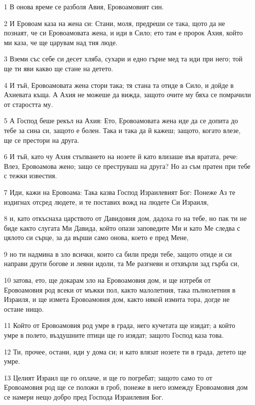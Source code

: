 \par 1 В онова време се разболя Авия, Еровоамовият син.
\par 2 И Еровоам каза на жена си: Стани, моля, предреши се така, щото да не познаят, че си Еровоамовата жена, и иди в Сило; ето там е пророк Ахия, който ми каза, че ще царувам над тия люде.
\par 3 Вземи със себе си десет хляба, сухари и едно гърне мед та иди при него; той ще ти яви какво ще стане на детето.
\par 4 И тъй, Еровоамовата жена стори така; тя стана та отиде в Сило, и дойде в Ахиевата къща. А Ахия не можеше да вижда, защото очите му бяха се помрачили от старостта му.
\par 5 А Господ беше рекъл на Ахия: Ето, Еровоамовата жена иде да се допита до тебе за сина си, защото е болен. Така и така да й кажеш; защото, когато влезе, ще се престори на друга.
\par 6 И тъй, като чу Ахия стъпването на нозете й като влизаше във вратата, рече: Влез, Еровоамова жено; защо се преструваш на друга? Но аз съм пратен при тебе с тежки известия.
\par 7 Иди, кажи на Еровоама: Така казва Господ Израилевият Бог: Понеже Аз те издигнах отсред людете, и те поставих вожд на людете Си Израиля,
\par 8 и, като откъснаха царството от Давидовия дом, дадоха го на тебе, но пак ти не биде както слугата Ми Давида, който опази заповедите Ми и като Ме следва с цялото си сърце, за да върши само онова, което е пред Мене,
\par 9 но ти надмина в зло всички, които са били преди тебе, защото отиде и си направи други богове и леяни идоли, та Ме разгневи и отхвърли зад гърба си,
\par 10 затова, ето, ще докарам зло на Еровоамовия дом, и ще изтребя от Еровоамовия род всеки от мъжки пол, както малолетния, така пълнолетния в Израиля, и ще измета Еровоамовия дом, както някой измита тора, догде не остане нищо.
\par 11 Който от Еровоамовия род умре в града, него кучетата ще изядат; а който умре в полето, въздушните птици ще го изядат; защото Господ каза това.
\par 12 Ти, прочее, остани, иди у дома си; и като влязат нозете ти в града, детето ще умре.
\par 13 Целият Израил ще го оплаче, и ще го погребат; защото само то от Еровоамовия род ще се положи в гроб, понеже в него измежду Еровоамовия дом се намери нещо добро пред Господа Израилевия Бог.
